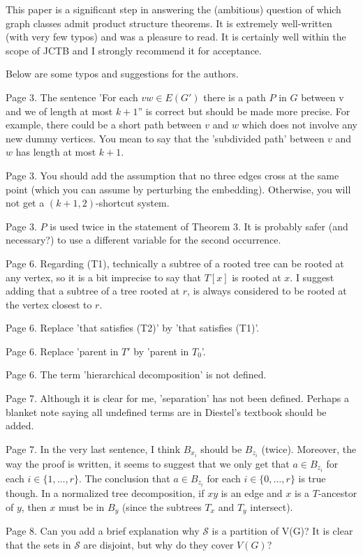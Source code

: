 \documentclass[12pt]{article}
\begin{document}
This paper is a significant step in answering the (ambitious) question
of which graph classes admit product structure theorems. It is
extremely well-written (with very few typos) and was a pleasure to
read.  It is certainly well within the scope of JCTB and I strongly
recommend it for acceptance.

Below are some typos and suggestions for the authors.

Page 3.  The sentence 'For each $vw \in E(G')$ there is a path $P$ in $G$
between v and we of length at most $k+1$'' is correct but should be made
more precise.  For example, there could be a short path between $v$ and
$w$ which does not involve any new dummy vertices.  You mean to say that
the 'subdivided path' between $v$ and $w$ has length at most $k+1$.

Page 3.  You should add the assumption that no three edges cross at
the same point (which you can assume by perturbing the embedding).
Otherwise, you will not get a $(k+1, 2)$-shortcut system.

Page 3. $P$ is used twice in the statement of Theorem 3.  It is probably
safer (and necessary?) to use a different variable for the second
occurrence.

Page 6. Regarding (T1), technically a subtree of a rooted tree can be
rooted at any vertex, so it is a bit imprecise to say that $T[x]$ is
rooted at $x$.  I suggest adding that a subtree of a tree rooted at $r$,
is always considered to be rooted at the vertex closest to $r$.

Page 6. Replace 'that satisfies (T2)' by 'that satisfies (T1)'.

Page 6. Replace 'parent in $T'$ by 'parent in $T_0$'.

Page 6. The term 'hierarchical decomposition' is not defined.

Page 7. Although it is clear for me, 'separation' has not been
defined.  Perhaps a blanket note saying all undefined terms are in
Diestel's textbook should be added.

Page 7.  In the very last sentence, I think $B_{x_i}$ should be $B_{z_i}$
(twice).  Moreover, the way the proof is written, it seems to suggest
that we only get that $a \in B_{z_i}$ for each $i \in \{1, \dots, r\}$.
The conclusion that $a \in B_{z_i}$ for each $i \in \{0, \dots, r\}$ is
true though.  In a normalized tree decomposition, if $xy$ is an edge and
$x$ is a $T$-ancestor of $y$, then $x$ must be in $B_y$ (since the subtrees $T_x$
and $T_y$ intersect).

Page 8.  Can you add a brief explanation why $\mathcal{S}$ is a
partition of V(G)?  It is clear that the sets in $\mathcal{S}$ are
disjoint, but why do they cover $V(G)$?
\end{document}
